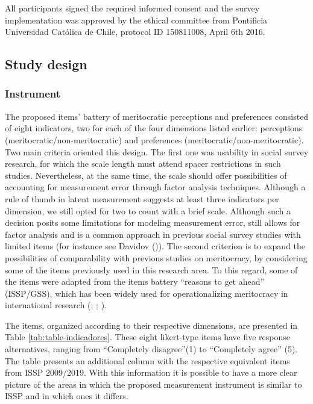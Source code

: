 \documentclass[
  10pt,
  a4paper,
]{article}
\begin{document}
All participants signed the required informed consent and the survey implementation was approved by the ethical committee from Pontificia Universidad Católica de Chile, protocol ID 150811008, April 6th 2016.

\subsection{Study design}\label{study-design}

\subsubsection{Instrument}\label{instrument}

The proposed items' battery of meritocratic perceptions and preferences consisted of eight indicators, two for each of the four dimensions listed earlier: perceptions (meritocratic/non-meritocratic) and preferences (meritocratic/non-meritocratic). Two main criteria oriented this design. The first one was usability in social survey research, for which the scale length must attend spacer restrictions in such studies. Nevertheless, at the same time, the scale should offer possibilities of accounting for measurement error through factor analysis techniques. Although a rule of thumb in latent measurement suggests at least three indicators per dimension, we still opted for two to count with a brief scale. Although such a decision posits some limitations for modeling measurement error, still allows for factor analysis and is a common approach in previous social survey studies with limited items (for instance see Davidov ()). The second criterion is to expand the possibilities of comparability with previous studies on meritocracy, by considering some of the items previously used in this research area. To this regard, some of the items were adapted from the items battery ``reasons to get ahead'' (ISSP/GSS), which has been widely used for operationalizing meritocracy in international research (; ; ).

The items, organized according to their respective dimensions, are presented in Table \ref{tab:table-indicadores}. These eight likert-type items have five response alternatives, ranging from ``Completely disagree''(1) to ``Completely agree'' (5). The table presents an additional column with the respective equivalent items from ISSP 2009/2019. With this information it is possible to have a more clear picture of the areas in which the proposed measurement instrument is similar to ISSP and in which ones it differs.
\end{document}
